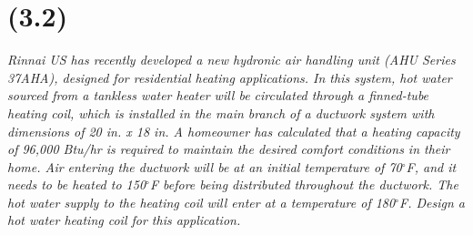 \section{(3.2)}

\textit{Rinnai US has recently developed a new hydronic air handling unit (AHU Series 37AHA), designed for residential heating applications. In this system, hot water sourced from a tankless water heater will be circulated through a finned-tube heating coil, which is installed in the main branch of a ductwork system with dimensions of 20 in. x 18 in. A homeowner has calculated that a heating capacity of 96,000 Btu/hr is required to maintain the desired comfort conditions in their home. Air entering the ductwork will be at an initial temperature of 70$^\circ$F, and it needs to be heated to 150$^\circ$F before being distributed throughout the ductwork. The hot water supply to the heating coil will enter at a temperature of 180$^\circ$F. Design a hot water heating coil for this application.}


